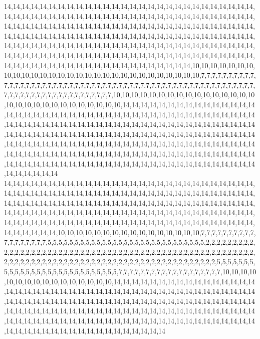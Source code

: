 14,14,14,14,14,14,14,14,14,14,14,14,14,14,14,14,14,14,14,14,14,14,14,14,14,14,14,14,14,14,14,14,14,14,14,14,14,14,14,14,14,14,14,14,14,14,14,14,14,14,14,14,14,14,14,14,14,14,14,14,14,14,14,14,14,14,14,14,14,14,14,14,14,14,14,14,14,14,14,14,14,14,14,14,14,14,14,14,14,14,14,14,14,14,14,14,14,14,14,14,14,14,14,14,14,14,14,14,14,14,14,14,14,14,14,14,14,14,14,14,14,14,14,14,14,14,14,14,14,14,14,14,14,14,14,14,14,14,14,14,14,14,14,14,14,14,14,14,14,14,14,14,14,14,14,14,14,14,14,14,14,14,14,14,14,14,14,14,14,14,14,14,14,14,14,14,14,14,14,14,14,14,14,14,14,14,14,14,14,10,10,10,10,10,10,10,10,10,10,10,10,10,10,10,10,10,10,10,10,10,10,10,10,10,10,10,10,10,7,7,7,7,7,7,7,7,7,7,7,7,7,7,7,7,7,7,7,7,7,7,7,7,7,7,7,7,7,7,7,7,7,7,7,7,7,7,7,7,7,7,7,7,7,7,7,7,7,7,7,7,7,7,7,7,7,7,7,7,7,7,7,7,7,7,7,7,7,7,7,7,7,7,7,7,10,10,10,10,10,10,10,10,10,10,10,10,10,10,10,10,10,10,10,10,10,10,10,10,10,10,10,10,10,14,14,14,14,14,14,14,14,14,14,14,14,14,14,14,14,14,14,14,14,14,14,14,14,14,14,14,14,14,14,14,14,14,14,14,14,14,14,14,14,14,14,14,14,14,14,14,14,14,14,14,14,14,14,14,14,14,14,14,14,14,14,14,14,14,14,14,14,14,14,14,14,14,14,14,14,14,14,14,14,14,14,14,14,14,14,14,14,14,14,14,14,14,14,14,14,14,14,14,14,14,14,14,14,14,14,14,14,14,14,14,14,14,14,14,14,14,14,14,14,14,14,14,14,14,14,14,14,14,14,14,14,14,14,14,14,14,14,14,14,14,14,14,14,14,14,14,14,14,14,14,14,14,14,14,14,14,14,14,14,14,14,14,14,14,14,14,14,14,14,14,14,14,14,14,14,14,14,14,14,14,14,14,14,14,14,14,14,14
14,14,14,14,14,14,14,14,14,14,14,14,14,14,14,14,14,14,14,14,14,14,14,14,14,14,14,14,14,14,14,14,14,14,14,14,14,14,14,14,14,14,14,14,14,14,14,14,14,14,14,14,14,14,14,14,14,14,14,14,14,14,14,14,14,14,14,14,14,14,14,14,14,14,14,14,14,14,14,14,14,14,14,14,14,14,14,14,14,14,14,14,14,14,14,14,14,14,14,14,14,14,14,14,14,14,14,14,14,14,14,14,14,14,14,14,14,14,14,14,14,14,14,14,14,14,14,14,14,14,14,14,14,14,14,14,14,14,14,14,14,14,14,14,14,14,10,10,10,10,10,10,10,10,10,10,10,10,10,10,10,10,7,7,7,7,7,7,7,7,7,7,7,7,7,7,7,7,7,7,5,5,5,5,5,5,5,5,5,5,5,5,5,5,5,5,5,5,5,5,5,5,5,5,5,5,5,5,5,2,2,2,2,2,2,2,2,2,2,2,2,2,2,2,2,2,2,2,2,2,2,2,2,2,2,2,2,2,2,2,2,2,2,2,2,2,2,2,2,2,2,2,2,2,2,2,2,2,2,2,2,2,2,2,2,2,2,2,2,2,2,2,2,2,2,2,2,2,2,2,2,2,2,2,2,2,2,2,2,2,2,2,2,2,2,2,2,2,2,2,2,2,2,5,5,5,5,5,5,5,5,5,5,5,5,5,5,5,5,5,5,5,5,5,5,5,5,5,5,5,5,7,7,7,7,7,7,7,7,7,7,7,7,7,7,7,7,7,7,7,10,10,10,10,10,10,10,10,10,10,10,10,10,10,10,10,14,14,14,14,14,14,14,14,14,14,14,14,14,14,14,14,14,14,14,14,14,14,14,14,14,14,14,14,14,14,14,14,14,14,14,14,14,14,14,14,14,14,14,14,14,14,14,14,14,14,14,14,14,14,14,14,14,14,14,14,14,14,14,14,14,14,14,14,14,14,14,14,14,14,14,14,14,14,14,14,14,14,14,14,14,14,14,14,14,14,14,14,14,14,14,14,14,14,14,14,14,14,14,14,14,14,14,14,14,14,14,14,14,14,14,14,14,14,14,14,14,14,14,14,14,14,14,14,14,14,14,14,14,14,14,14,14,14,14,14,14,14,14,14,14,14
